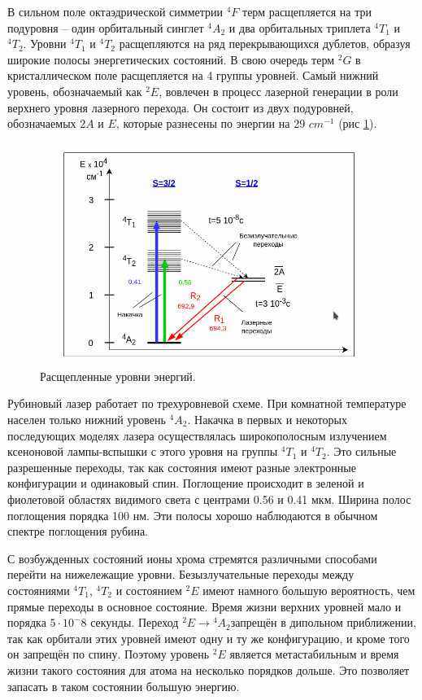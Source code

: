 \documentclass[a4paper,12pt]{article}
\theoremstyle{plain} %
\theoremstyle{definition} %
\theoremstyle{remark} %
\begin{document}
В сильном поле октаэдрической симметрии ${}^4F$ терм расщепляется на три подуровня --
один орбитальный синглет ${}^4A_2$ и два орбитальных триплета ${}^4T_1$ и ${}^4T_2$.
Уровни ${}^4T_1$ и ${}^4T_2$  расщепляются на ряд перекрывающихся дублетов, образуя широкие полосы энергетических состояний. В свою очередь терм ${}^2G$ в кристаллическом поле расщепляется на 4 группы уровней. Самый нижний уровень, обозначаемый как ${}^2E$, вовлечен в процесс лазерной генерации в роли верхнего уровня лазерного перехода. Он состоит из двух подуровней, обозначаемых $2A$ и $E$, которые разнесены по энергии на 29 $cm^{-1}$ (рис \ref{fig:2sistem2}).

\begin{figure}[h!]
	\centering
	\includegraphics[scale=0.7]{pict3.png}
	\caption{Расщепленные уровни энергий.}
	\label{fig:2sistem2}
\end{figure}

Рубиновый лазер работает по трехуровневой схеме. При комнатной температуре населен только нижний уровень ${}^4A_2$.  Накачка в первых и некоторых последующих моделях лазера осуществлялась широкополосным излучением ксеноновой лампы-вспышки с этого уровня на группы ${}^4T_1$ и ${}^4T_2$. Это сильные разрешенные переходы, так как состояния имеют разные электронные конфигурации и одинаковый спин. Поглощение происходит в зеленой и фиолетовой областях видимого света с центрами 0.56 и 0.41 мкм. Ширина полос поглощения порядка 100 нм. Эти полосы хорошо наблюдаются в обычном спектре поглощения рубина.

 С возбужденных состояний ионы хрома стремятся различными способами перейти на нижележащие уровни. Безызлучательные переходы между состояниями ${}^4T_1$, ${}^4T_2$ и состоянием ${}^2E$ имеют намного большую вероятность, чем прямые переходы в основное состояние. Время жизни верхних уровней мало и порядка $5\cdot10^-8$ секунды. Переход ${}^2E \longrightarrow {}^4A_2$запрещён в дипольном приближении, так как орбитали этих уровней имеют одну и ту же конфигурацию, и кроме того он запрещён по спину. Поэтому уровень ${}^2E$ является метастабильным и время жизни такого состояния для атома на несколько порядков дольше. Это позволяет запасать в таком состоянии большую энергию.
 
\end{document}
